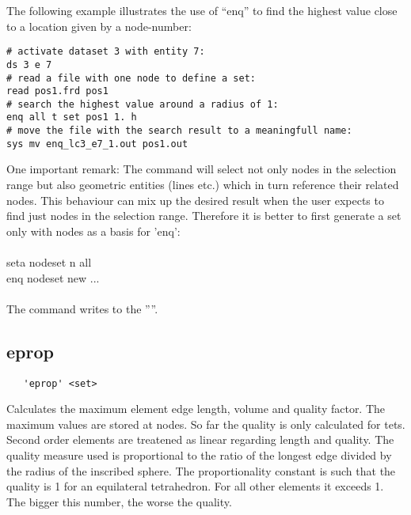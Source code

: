 \documentclass{article}
\begin{document}
The following example illustrates the use of ``enq'' to find the highest value close to a location given by a node-number: 
\begin{verbatim}
# activate dataset 3 with entity 7:
ds 3 e 7
# read a file with one node to define a set:
read pos1.frd pos1
# search the highest value around a radius of 1:
enq all t set pos1 1. h
# move the file with the search result to a meaningfull name:
sys mv enq_lc3_e7_1.out pos1.out
\end{verbatim}

One important remark:
The command will select not only nodes in the selection range but also geometric entities (lines etc.) which in turn reference their related nodes. This behaviour can mix up the desired result when the user expects to find just nodes in the selection range. Therefore it is better to first generate a set only with nodes as a basis for 'enq':\\\\
seta nodeset n all\\
enq nodeset new ...\\\\
The command writes to the ''''.


\subsection{\label{eprop}eprop}
\begin{verbatim}
   'eprop' <set>
\end{verbatim}
Calculates the maximum element edge length, volume and quality factor. The maximum values are stored at nodes. So far the quality is only calculated for tets. Second order elements are treatened as linear regarding length and quality. The quality measure used is proportional to the ratio of the longest edge divided by the radius of the inscribed sphere. The proportionality constant is such that the quality is 1 for an equilateral tetrahedron. For all other elements it exceeds 1. The bigger this number, the worse the quality.
\end{document}
